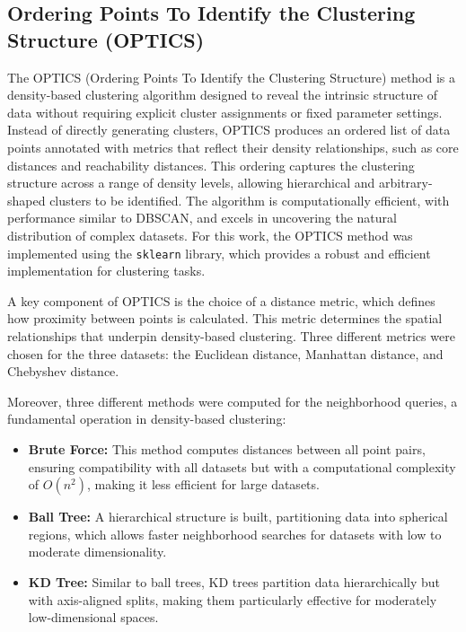 \subsection{Ordering Points To Identify the Clustering Structure (OPTICS)}

The OPTICS (Ordering Points To Identify the Clustering Structure) method is a density-based clustering algorithm designed
to reveal the intrinsic structure of data without requiring explicit cluster assignments or fixed parameter settings.
Instead of directly generating clusters, OPTICS produces an ordered list of data points annotated with metrics that
reflect their density relationships, such as core distances and reachability distances. This ordering captures the
clustering structure across a range of density levels, allowing hierarchical and arbitrary-shaped clusters to be identified.
The algorithm is computationally efficient, with performance similar to DBSCAN, and excels in uncovering the natural
distribution of complex datasets. For this work, the OPTICS method was implemented using the \texttt{sklearn} library, which provides a robust and efficient implementation for clustering tasks.

A key component of OPTICS is the choice of a distance metric, which defines how proximity between points is calculated.
This metric determines the spatial relationships that underpin density-based clustering. Three different metrics were chosen
for the three datasets: the Euclidean distance, Manhattan distance, and Chebyshev distance.

Moreover, three different methods were computed for the neighborhood queries, a fundamental operation in density-based
clustering:
\begin{itemize}
    \item \textbf{Brute Force:} This method computes distances between all point pairs, ensuring compatibility with all
    datasets but with a computational complexity of $O(n^2)$, making it less efficient for large datasets.
    \item \textbf{Ball Tree:} A hierarchical structure is built, partitioning data into spherical regions, which allows
    faster neighborhood searches for datasets with low to moderate dimensionality.
    \item \textbf{KD Tree:} Similar to ball trees, KD trees partition data hierarchically but with axis-aligned splits,
    making them particularly effective for moderately low-dimensional spaces.
\end{itemize}

